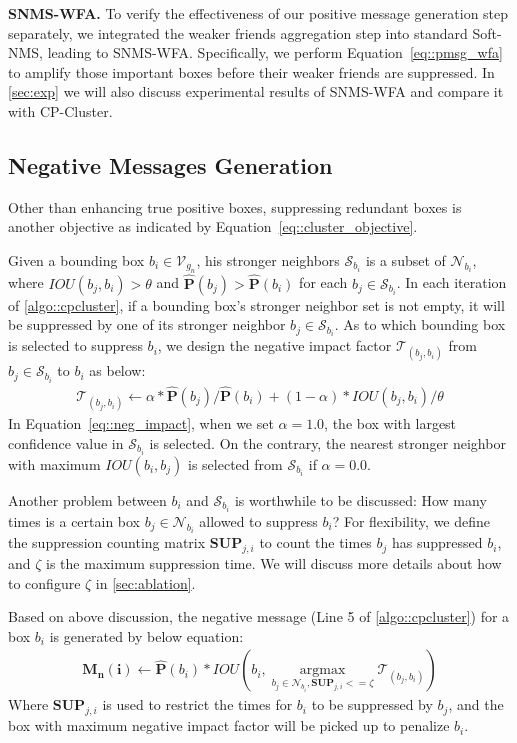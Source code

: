 \documentclass[10pt,twocolumn,letterpaper]{article}
\begin{document}
\textbf{SNMS-WFA.} To verify the effectiveness of our positive message generation step separately, we integrated the weaker friends aggregation step into standard Soft-NMS, leading to SNMS-WFA.
Specifically, we perform Equation~\eqref{eq::pmsg_wfa} to amplify those important boxes before their weaker friends are suppressed.
In \cref{sec:exp} we will also discuss experimental results of SNMS-WFA and compare it with CP-Cluster.

\subsection{Negative Messages Generation}
\label{sec:sub_neg_msg}
Other than enhancing true positive boxes, suppressing redundant boxes is another objective as indicated by Equation~\eqref{eq::cluster_objective}.\par

Given a bounding box $b_i\in\mathcal{V}_{g_{n}}$, his stronger neighbors $\mathcal{S}_{b_{i}}$ is a subset of $\mathcal{N}_{b_{i}}$, where $IOU(b_{j},b_{i})>\theta$ and $\mathbf{\hat{P}}(b_j)>\mathbf{\hat{P}}(b_i)$ for each $b_{j}\in\mathcal{S}_{b_{i}}$.
In each iteration of \cref{algo::cpcluster}, if a bounding box's stronger neighbor set is not empty, it will be suppressed by one of its stronger neighbor $b_j\in\mathcal{S}_{b_{i}}$.
As to which bounding box is selected to suppress $b_i$, we design the negative impact factor $\mathcal{T}_{(b_{j},b_{i})}$ from $b_j\in\mathcal{S}_{b_{i}}$ to $b_i$ as below:
\begin{align}
  \mathcal{T}_{(b_{j},b_{i})} \leftarrow \alpha*\mathbf{\hat{P}}(b_j)/\mathbf{\hat{P}}(b_i) + (1-\alpha)*IOU(b_j,b_i)/\theta \label{eq::neg_impact}
\end{align}
In Equation~\eqref{eq::neg_impact}, when we set $\alpha=1.0$, the box with largest confidence value in $\mathcal{S}_{b_{i}}$ is selected.
On the contrary, the nearest stronger neighbor with maximum $IOU(b_i,b_j)$ is selected from $\mathcal{S}_{b_{i}}$ if $\alpha=0.0$.

Another problem between $b_i$ and $\mathcal{S}_{b_{i}}$ is worthwhile to be discussed: How many times is a certain box $b_j\in\mathcal{N}_{b_{i}}$ allowed to suppress $b_i$?
For flexibility, we define the suppression counting matrix $\mathbf{SUP}_{j,i}$ to count the times $b_j$ has suppressed $b_i$, and $\zeta$ is the maximum suppression time.
We will discuss more details about how to configure $\zeta$ in \cref{sec:ablation}.

Based on above discussion, the negative message (Line 5 of \cref{algo::cpcluster}) for a box $b_i$ is generated by below equation:
\begin{align}
  \mathbf{M_n(i)} \leftarrow \mathbf{\hat{P}}(b_i) * IOU(b_i,\mathop{\arg\max}\limits_{b_j\in\mathcal{N}_{b_{i}},\mathbf{SUP}_{j,i}<=\zeta}\mathcal{T}_{(b_{j},b_{i})}) \label{eq::nmsg}
\end{align}
Where $\mathbf{SUP}_{j,i}$ is used to restrict the times for $b_i$ to be suppressed by $b_j$, and the box with maximum negative impact factor will be picked up to penalize $b_i$.
\end{document}

